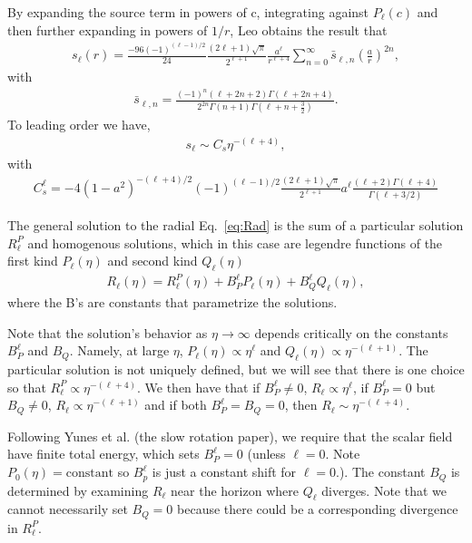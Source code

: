 \documentclass[aps,prd,amsmath,showpacs,amssymb,superscriptaddress,nofootinbib,longbibliography,eqsecnum,preprintnumbers]{revtex4-1}
\begin{document}
By expanding the source term in powers of c, integrating against $P_{\ell}(c)$ and then further expanding in powers of $1/r$, Leo obtains the result that 
\begin{align}
s_{\ell}(r)=\frac{-96(-1)^{(\ell-1)/2}}{24}\frac{(2\ell +1)\sqrt{\pi}}{2^{\ell+1}}\frac{a^\ell}{r^{\ell+4}}\sum_{n=0}^\infty \bar s_{\ell ,n}\left(\frac{a}{r}\right)^{2n},
\end{align}
with
\begin{align}
\bar s_{\ell ,n}=\frac{(-1)^n(\ell+2n+2)\Gamma(\ell +2n+4)}{2^{2n}\Gamma(n+1)\Gamma(\ell +n +\frac{3}{2})}.
\end{align}
To leading order we have,
\begin{align}
s_{\ell}\sim C_s \eta^{-(\ell +4)},
\end{align}
with \begin{align}
C^\ell_{s}=-4(1-a^2)^{-(\ell+4)/2}(-1)^{(\ell-1)/2}\frac{(2\ell+1)\sqrt{\pi}}{2^{\ell+1}}a^\ell\frac{(\ell +2)\Gamma(\ell+4)}{\Gamma(\ell +3/2)}
\end{align}

The general solution to the radial Eq.~\eqref{eq:Rad} is the sum of a particular solution $R^P_\ell$ and homogenous solutions, which in this case are legendre functions of the first kind $P_{\ell}(\eta)$ and second kind $Q_{\ell}(\eta)$
\begin{align} 
R_{\ell}(\eta)=R_{\ell}^P(\eta)+ B_P^\ell P_{\ell}(\eta)+B^\ell_Q Q_{\ell}(\eta),
\end{align}
where the B's are constants that parametrize the solutions. 

Note that the solution's behavior as $\eta \to \infty$ depends critically on the constants $B_P^\ell$ and $B_Q$. Namely, at large $\eta$, $P_{\ell}(\eta) \propto \eta^\ell$ and $Q_{\ell}(\eta)\propto \eta^{-(\ell+1)}$. The particular solution is not uniquely defined, but we will see that there is one choice so that $R^P_\ell \propto \eta^{-(\ell+4)}$. We then have that if $B_P^\ell\neq 0$, $R_{\ell} \propto \eta^\ell$, if $B_P^\ell = 0$ but $B_{Q}\neq 0$, $R_{\ell}\propto \eta^{-(\ell+1)}$ and if both $B_P^\ell=B_Q =0$, then $R_{\ell}\sim \eta^{-(\ell+4)}$. 

Following Yunes et al. (the slow rotation paper), we require that the scalar field have finite total energy, which sets $B_P^\ell =0$ (unless $\ell =0$.  Note $P_0(\eta)=\text{constant}$ so $B_p^\ell$ is just a constant shift for $\ell =0$.). The constant $B_Q$ is determined by examining $R_\ell$ near the horizon where $Q_{\ell}$ diverges. Note that we cannot necessarily set $B_Q=0$ because there could be a corresponding divergence in $R^P_\ell$.
\end{document}
